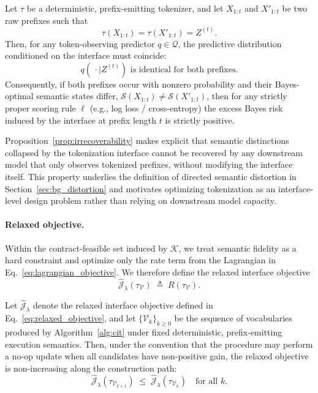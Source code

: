 \begin{proposition}
\label{prop:irrecoverability}
Let $\tau$ be a deterministic, prefix-emitting tokenizer, and let
$X_{1:t}$ and $X'_{1:t}$ be two raw prefixes such that
\[
\tau(X_{1:t}) = \tau(X'_{1:t}) = Z^{(t)}.
\]
Then, for any token-observing predictor $q \in \mathcal{Q}$, the predictive distribution conditioned on the interface must coincide:
\[
q(\,\cdot \mid Z^{(t)}) \text{ is identical for both prefixes.}
\]
Consequently, if both prefixes occur with nonzero probability and their Bayes-optimal semantic states differ,
$\mathcal{S}(X_{1:t}) \neq \mathcal{S}(X'_{1:t})$, then for any strictly proper scoring rule $\ell$ (e.g., log loss / cross-entropy) the excess Bayes risk induced by the interface at prefix length $t$ is strictly positive.
\end{proposition}

Proposition~\ref{prop:irrecoverability} makes explicit that semantic distinctions collapsed by the
tokenization interface cannot be recovered by any downstream model that only observes tokenized prefixes, without modifying the
interface itself.
This property underlies the definition of directed semantic distortion in
Section~\ref{sec:bg_distortion} and motivates optimizing tokenization as an interface-level design problem
rather than relying on downstream model capacity.

\paragraph{Relaxed objective.}
Within the contract-feasible set induced by $\mathcal{K}$, we treat semantic fidelity as a hard constraint and optimize only the rate term from the Lagrangian in Eq.~\eqref{eq:lagrangian_objective}.
We therefore define the relaxed interface objective
\begin{equation}
\widehat{\mathcal{J}}_\lambda(\tau_{\mathcal{V}})
\;\triangleq\;
R(\tau_{\mathcal{V}}).
\label{eq:relaxed_objective}
\end{equation}

\begin{proposition}
\label{prop:greedy_descent}
Let $\widehat{\mathcal{J}}_\lambda$ denote the relaxed interface objective defined in
Eq.~\eqref{eq:relaxed_objective}, and let
$\{\mathcal{V}_k\}_{k \ge 0}$ be the sequence of vocabularies produced by
Algorithm~\ref{alg:cit} under fixed deterministic, prefix-emitting execution semantics.
Then, under the convention that the procedure may perform a no-op update when all candidates have non-positive gain, the relaxed objective is non-increasing along the construction path:
\[
\widehat{\mathcal{J}}_\lambda(\tau_{\mathcal{V}_{k+1}})
\;\le\;
\widehat{\mathcal{J}}_\lambda(\tau_{\mathcal{V}_{k}})
\quad \text{for all } k.
\]
\end{proposition}


